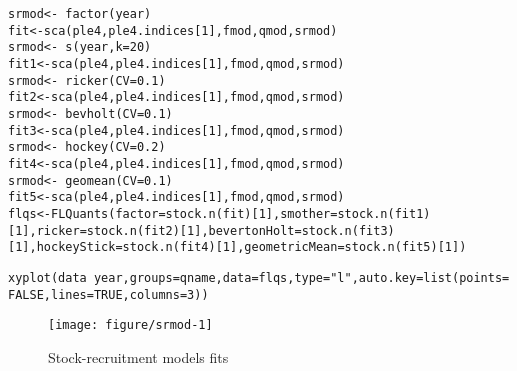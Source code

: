 \documentclass[a4paper,english,10pt]{article}\usepackage[]{graphicx}\usepackage[]{color}
\makeatletter
\def\maxwidth{ %
  \ifdim\Gin@nat@width>\linewidth
    \linewidth
  \else
    \Gin@nat@width
  \fi
}
\newcommand{\hlnum}[1]{\textcolor[rgb]{0.2,0.2,0.2}{#1}}%
\newcommand{\hlstr}[1]{\textcolor[rgb]{0.2,0.2,0.2}{#1}}%
\newcommand{\hlopt}[1]{\textcolor[rgb]{0.2,0.2,0.2}{#1}}%
\newcommand{\hlstd}[1]{\textcolor[rgb]{0,0,0}{#1}}%
\newcommand{\hlkwb}[1]{\textcolor[rgb]{0.361,0.506,0.596}{#1}}%
\newcommand{\hlkwc}[1]{\textcolor[rgb]{0.361,0.506,0.596}{#1}}%
\newcommand{\hlkwd}[1]{\textcolor[rgb]{0.361,0.506,0.596}{#1}}%
\newenvironment{kframe}{%
 \def\at@end@of@kframe{}%
 \ifinner\ifhmode%
  \def\at@end@of@kframe{\end{minipage}}%
  \begin{minipage}{\columnwidth}%
 \fi\fi%
 \def\FrameCommand##1{\hskip\@totalleftmargin \hskip-\fboxsep
 \colorbox{shadecolor}{##1}\hskip-\fboxsep
     \hskip-\linewidth \hskip-\@totalleftmargin \hskip\columnwidth}%
 \MakeFramed {\advance\hsize-\width
   \@totalleftmargin\z@ \linewidth\hsize
   \@setminipage}}%
 {\par\unskip\endMakeFramed%
 \at@end@of@kframe}
\newenvironment{knitrout}{}{} %
\makeatother
\begin{document}
\begin{knitrout}
\color{fgcolor}\begin{kframe}
\begin{alltt}
\hlstd{srmod} \hlkwb{<-} \hlopt{~} \hlkwd{factor}\hlstd{(year)}
\hlstd{fit} \hlkwb{<-} \hlkwd{sca}\hlstd{(ple4, ple4.indices[}\hlnum{1}\hlstd{], fmod, qmod, srmod)}
\hlstd{srmod} \hlkwb{<-} \hlopt{~} \hlkwd{s}\hlstd{(year,} \hlkwc{k}\hlstd{=}\hlnum{20}\hlstd{)}
\hlstd{fit1} \hlkwb{<-} \hlkwd{sca}\hlstd{(ple4, ple4.indices[}\hlnum{1}\hlstd{], fmod, qmod, srmod)}
\hlstd{srmod} \hlkwb{<-} \hlopt{~} \hlkwd{ricker}\hlstd{(}\hlkwc{CV}\hlstd{=}\hlnum{0.1}\hlstd{)}
\hlstd{fit2} \hlkwb{<-} \hlkwd{sca}\hlstd{(ple4, ple4.indices[}\hlnum{1}\hlstd{], fmod, qmod, srmod)}
\hlstd{srmod} \hlkwb{<-} \hlopt{~} \hlkwd{bevholt}\hlstd{(}\hlkwc{CV}\hlstd{=}\hlnum{0.1}\hlstd{)}
\hlstd{fit3} \hlkwb{<-} \hlkwd{sca}\hlstd{(ple4, ple4.indices[}\hlnum{1}\hlstd{], fmod, qmod, srmod)}
\hlstd{srmod} \hlkwb{<-} \hlopt{~} \hlkwd{hockey}\hlstd{(}\hlkwc{CV}\hlstd{=}\hlnum{0.2}\hlstd{)}
\hlstd{fit4} \hlkwb{<-} \hlkwd{sca}\hlstd{(ple4, ple4.indices[}\hlnum{1}\hlstd{], fmod, qmod, srmod)}
\hlstd{srmod} \hlkwb{<-} \hlopt{~} \hlkwd{geomean}\hlstd{(}\hlkwc{CV}\hlstd{=}\hlnum{0.1}\hlstd{)}
\hlstd{fit5} \hlkwb{<-} \hlkwd{sca}\hlstd{(ple4, ple4.indices[}\hlnum{1}\hlstd{], fmod, qmod, srmod)}
\hlstd{flqs} \hlkwb{<-} \hlkwd{FLQuants}\hlstd{(}\hlkwc{factor}\hlstd{=}\hlkwd{stock.n}\hlstd{(fit)[}\hlnum{1}\hlstd{],} \hlkwc{smother}\hlstd{=}\hlkwd{stock.n}\hlstd{(fit1)[}\hlnum{1}\hlstd{],} \hlkwc{ricker}\hlstd{=}\hlkwd{stock.n}\hlstd{(fit2)[}\hlnum{1}\hlstd{],} \hlkwc{bevertonHolt}\hlstd{=}\hlkwd{stock.n}\hlstd{(fit3)[}\hlnum{1}\hlstd{],} \hlkwc{hockeyStick}\hlstd{=}\hlkwd{stock.n}\hlstd{(fit4)[}\hlnum{1}\hlstd{],} \hlkwc{geometricMean}\hlstd{=}\hlkwd{stock.n}\hlstd{(fit5)[}\hlnum{1}\hlstd{])}
\end{alltt}
\end{kframe}
\end{knitrout}

\begin{knitrout}
\color{fgcolor}\begin{kframe}
\begin{alltt}
\hlkwd{xyplot}\hlstd{(data}\hlopt{~}\hlstd{year,} \hlkwc{groups}\hlstd{=qname,} \hlkwc{data}\hlstd{=flqs,} \hlkwc{type}\hlstd{=}\hlstr{"l"}\hlstd{,} \hlkwc{auto.key}\hlstd{=}\hlkwd{list}\hlstd{(}\hlkwc{points}\hlstd{=}\hlnum{FALSE}\hlstd{,} \hlkwc{lines}\hlstd{=}\hlnum{TRUE}\hlstd{,} \hlkwc{columns}\hlstd{=}\hlnum{3}\hlstd{))}
\end{alltt}
\end{kframe}\begin{figure}[H]

{\centering \texttt{[image: figure/srmod-1]} 

}

\caption[Stock-recruitment models fits]{Stock-recruitment models fits\label{fig:srmod}}
\end{figure}


\end{knitrout}
\end{document}
